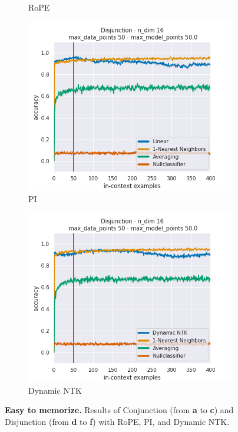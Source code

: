 \documentclass[letterpaper]{article} %
\begin{document}
\begin{figure}[tp]
\begin{subfigure}[t]{0.32\linewidth}
        \caption{RoPE}
    \end{subfigure}
    \begin{subfigure}[t]{0.32\linewidth}
        \includegraphics[width=\linewidth]{AnonymousSubmission/LaTeX/imgs/appendix/disjunction/linear.png}
        \caption{PI}
    \end{subfigure}
    \begin{subfigure}[t]{0.32\linewidth}
        \includegraphics[width=\linewidth]{AnonymousSubmission/LaTeX/imgs/appendix/disjunction/ntk.png}
        \caption{Dynamic NTK}
    \end{subfigure}
    \caption{\small\textbf{Easy to memorize.} Results of Conjunction (from \textbf{a} to \textbf{c}) and Disjunction (from \textbf{d} to \textbf{f}) with RoPE, PI, and Dynamic NTK.}
    \label{fig:easy_appendix}
\end{figure}
\end{document}
